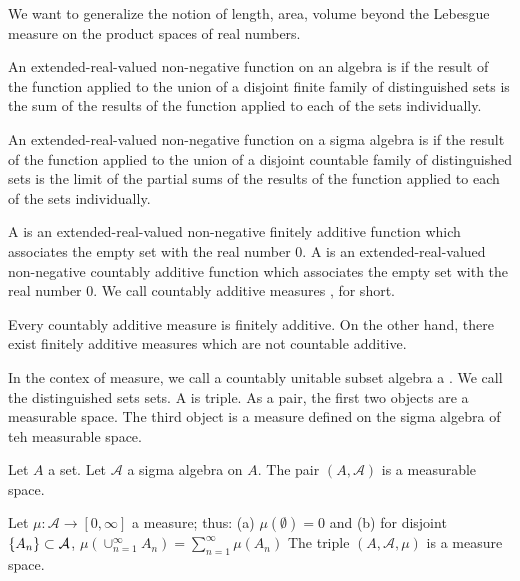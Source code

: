 
\sbasic



\sstart



We want to generalize the notion
of length, area, volume beyond the
Lebesgue measure on the product spaces
of real numbers.


An extended-real-valued non-negative
function on an algebra is
if the result of the function applied to
the union of a disjoint finite family of
distinguished sets is the sum of the
results of the function applied to each
of the sets individually.

An extended-real-valued non-negative
function on a sigma algebra is
if the result of the function applied to
the union of a disjoint countable family of
distinguished sets is the limit of the partial
sums of the results of the function applied
to each of the sets individually.

A
is an extended-real-valued non-negative
finitely additive function which associates the empty
set with the real number $0$.
A
is an extended-real-valued non-negative
countably additive function which associates the empty
set with the real number $0$.
We call countably additive measures
, for short.

Every countably additive measure is finitely additive.
On the other hand, there exist finitely additive measures
which are not countable additive.

In the contex of measure,
we call a countably unitable subset algebra
a .
We call the distinguished sets
sets.
A
is triple.
As a pair, the first two
objects are a measurable space.
The third object is a measure defined
on the sigma algebra of teh measurable space.


Let $A$ a set.
Let $\mathcal{A}$ a sigma algebra on $A$.
The pair $(A, \mathcal{A})$ is a measurable space.

Let $\mu: \mathcal{A} \to [0, \infty]$ a measure;
thus:
(a) $\mu(\emptyset) = 0$ and
(b) for disjoint $\{A_n\} \subset \mathcal{A}$,
$\mu(\cup_{n = 1}^{\infty} A_n)
  = \sum_{n = 1}^{\infty} \mu(A_n)$
The triple $(A, \mathcal{A}, \mu)$ is a
measure space.

